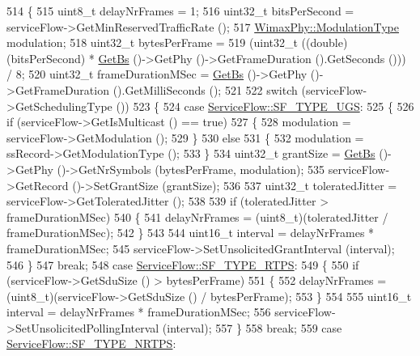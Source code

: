 \begin{DoxyCode}
514 \{
515   uint8\_t delayNrFrames = 1;
516   uint32\_t bitsPerSecond = serviceFlow->GetMinReservedTrafficRate ();
517   \hyperlink{classns3_1_1WimaxPhy_a044c5d8a48ca992c39c2a946f6e755fa}{WimaxPhy::ModulationType} modulation;
518   uint32\_t bytesPerFrame =
519     (uint32\_t ((\textcolor{keywordtype}{double})(bitsPerSecond) * \hyperlink{classns3_1_1UplinkScheduler_afe61b7de71d92d2dff1b135744a6ff7e}{GetBs} ()->GetPhy ()->GetFrameDuration ().GetSeconds ())) / 8;
520   uint32\_t frameDurationMSec = \hyperlink{classns3_1_1UplinkScheduler_afe61b7de71d92d2dff1b135744a6ff7e}{GetBs} ()->GetPhy ()->GetFrameDuration ().GetMilliSeconds ();
521 
522   \textcolor{keywordflow}{switch} (serviceFlow->GetSchedulingType ())
523     \{
524     \textcolor{keywordflow}{case} \hyperlink{classns3_1_1ServiceFlow_a7990ba10be1e098328fd1e6382a26235a969e0b62fa12fef1dbb23913744ed594}{ServiceFlow::SF\_TYPE\_UGS}:
525       \{
526         \textcolor{keywordflow}{if} (serviceFlow->GetIsMulticast () == \textcolor{keyword}{true})
527           \{
528             modulation = serviceFlow->GetModulation ();
529           \}
530         \textcolor{keywordflow}{else}
531           \{
532             modulation = ssRecord->GetModulationType ();
533           \}
534         uint32\_t grantSize = \hyperlink{classns3_1_1UplinkScheduler_afe61b7de71d92d2dff1b135744a6ff7e}{GetBs} ()->GetPhy ()->GetNrSymbols (bytesPerFrame, modulation);
535         serviceFlow->GetRecord ()->SetGrantSize (grantSize);
536 
537         uint32\_t toleratedJitter = serviceFlow->GetToleratedJitter ();
538 
539         \textcolor{keywordflow}{if} (toleratedJitter > frameDurationMSec)
540           \{
541             delayNrFrames = (uint8\_t)(toleratedJitter / frameDurationMSec);
542           \}
543 
544         uint16\_t interval = delayNrFrames * frameDurationMSec;
545         serviceFlow->SetUnsolicitedGrantInterval (interval);
546       \}
547       \textcolor{keywordflow}{break};
548     \textcolor{keywordflow}{case} \hyperlink{classns3_1_1ServiceFlow_a7990ba10be1e098328fd1e6382a26235a0e98ff713b932a029acad7e5b24bbf55}{ServiceFlow::SF\_TYPE\_RTPS}:
549       \{
550         \textcolor{keywordflow}{if} (serviceFlow->GetSduSize () > bytesPerFrame)
551           \{
552             delayNrFrames = (uint8\_t)(serviceFlow->GetSduSize () / bytesPerFrame);
553           \}
554 
555         uint16\_t interval = delayNrFrames * frameDurationMSec;
556         serviceFlow->SetUnsolicitedPollingInterval (interval);
557       \}
558       \textcolor{keywordflow}{break};
559     \textcolor{keywordflow}{case} \hyperlink{classns3_1_1ServiceFlow_a7990ba10be1e098328fd1e6382a26235a7f8577f851a9f01d159442a3a3fcdf48}{ServiceFlow::SF\_TYPE\_NRTPS}:

\end{DoxyCode}
